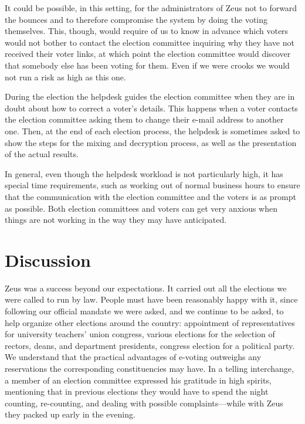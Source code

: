 \documentclass[jets]{usenixjournal}
\begin{document}
It could be possible, in this setting, for the administrators of Zeus
not to forward the bounces and to therefore compromise the system by
doing the voting themselves. This, though, would require of us to know
in advance which voters would not bother to contact the election
committee inquiring why they have not received their voter links, at
which point the election committee would discover that somebody else
has been voting for them. Even if we were crooks we would not run a
risk as high as this one.

During the election the helpdesk guides the election committee when
they are in doubt about how to correct a voter's details. This happens
when a voter contacts the election committee asking them to change
their e-mail address to another one. Then, at the end of each election
process, the helpdesk is sometimes asked to show the steps for the
mixing and decryption process, as well as the presentation of the
actual results.

In general, even though the helpdesk workload is not particularly
high, it has special time requirements, such as working out of normal
business hours to ensure that the communication with the election
committee and the voters is as prompt as possible. Both election
committees and voters can get very anxious when things are not working
in the way they may have anticipated.



\section{Discussion}
\label{sec:discussion}

Zeus was a success beyond our expectations. It carried out all the
elections we were called to run by law. People must have been
reasonably happy with it, since following our official mandate we were
asked, and we continue to be asked, to help organize other elections
around the country: appointment of representatives for university
teachers' union congress, various elections for the selection of
rectors, deans, and department presidents, congress election for a
political party. We understand that the practical advantages of
e-voting outweighs any reservations the corresponding constituencies
may have. In a telling interchange, a member of an election committee
expressed his gratitude in high spirits, mentioning that in previous
elections they would have to spend the night counting, re-counting,
and dealing with possible complaints---while with Zeus they packed up
early in the evening.
\end{document}
